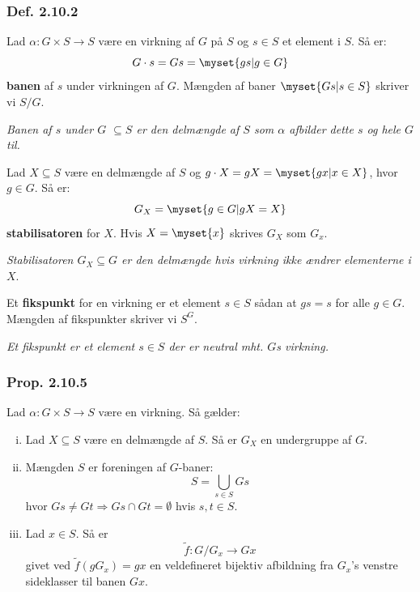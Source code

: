 \subsubsection{Def. 2.10.2}
\label{2.10.2}
Lad $\alpha: G \times S \rightarrow S$ være en virkning af $G$ på $S$ og $s \in
S$ et element i $S$. Så er:
\begin{equation*}
  G \cdot s = Gs = \myset{gs|g \in G}
\end{equation*}
\textbf{banen} af $s$ under virkningen af $G$. Mængden af baner
$\myset{Gs|s \in S}$ skriver vi $S/G$.

\textit{Banen af $s$ under $G$  $\subseteq S$ er den delmængde af $S$ som
$\alpha$ afbilder dette $s$ og hele $G$ til.}

Lad $X \subseteq S$ være en delmængde af $S$ og $g \cdot X = gX = \myset{gx|x
\in X}$, hvor $g \in G$. Så er:
\begin{equation*}
  G_X = \myset{g \in G|gX = X}
\end{equation*}
\textbf{stabilisatoren} for $X$. Hvis $X = \myset{x}$ skrives $G_X$ som
$G_x$.

\textit{Stabilisatoren $G_X \subseteq G$ er den delmængde hvis virkning
ikke ændrer elementerne i $X$}.

Et \textbf{fikspunkt} for en virkning er et element $s \in S$ sådan at $gs = s$
for alle $g \in G$. Mængden af fikspunkter skriver vi $S^G$.

\textit{Et fikspunkt er et element $s \in S$ der er neutral mht. $G$s virkning.}

\subsubsection{Prop. 2.10.5}
Lad $\alpha: G \times S \rightarrow S$ være en virkning. Så gælder:
\begin{enumerate}[(i)]
  \item Lad $X \subseteq S$ være en delmængde af $S$. Så er $G_X$ en undergruppe
  af $G$.
  \item Mængden $S$ er foreningen af $G$-baner:
  \begin{equation*}
  S = \bigcup_{s \in S}Gs
  \end{equation*}
  hvor $Gs \neq Gt \Rightarrow Gs \cap Gt = \emptyset$ hvis $s, t \in S$.
  \item Lad $x \in S$. Så er
  \begin{equation*}
  \tilde{f}: G/G_x \rightarrow Gx
  \end{equation*}
  givet ved $\tilde{f}(gG_x) = gx$ en veldefineret bijektiv afbildning fra
  $G_x$'s venstre sideklasser til banen $Gx$.
\end{enumerate}

